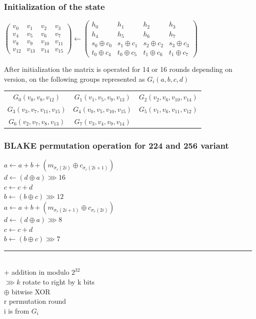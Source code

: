 \documentclass{beamer}
\begin{document}
\begin{frame}
\frametitle{Initialization of the state}
\begin{center}
$\begin{pmatrix} v_{0} & v_{1} & v_{2} & v_{3} \\ v_{4} & v_{5} & v_{6} & v_{7} \\
                 v_{8} & v_{9} & v_{10} & v_{11} \\ v_{12} & v_{13} & v_{14} & v_{15}\end{pmatrix} 
\gets
\begin{pmatrix} h_{0} & h_{1} & h_{2} & h_{3} \\ h_{4} & h_{5} & h_{6} & h_{7} \\
   s_{0} \oplus c_{0} & s_{1} \oplus c_{1} & s_{2} \oplus c_{2} & s_{3} \oplus c_{3} \\ 
   t_{0} \oplus c_{4} & t_{0} \oplus c_{5} & t_{1} \oplus c_{6} & t_{1} \oplus c_{7} \end{pmatrix}$
\end{center}
After initialization the matrix is operated for 14 or 16 rounds depending on version, on the following 
groups represented as $G_{i}(a, b, c, d)$
\begin{table}
  \begin{center}
    \begin{tabular}{ *{3}{c}}
    $ G_{0}(v_{0}, v_{8}, v_{12})$ & $G_{1}(v_{1}, v_{5}, v_{9}, v_{13})$ & $G_{2}(v_{2}, v_{6}, v_{10}, v_{14})$ \\
    $G_{3}(v_{3}, v_{7}, v_{11}, v_{15}) $ & $G_{4}(v_{0}, v_{5}, v_{10}, v_{15})$ & $G_{5}(v_{1}, v_{6}, v_{11}, v_{12})$ \\
    $G_{6}(v_{2}, v_{7}, v_{8}, v_{13})$ & $G_{7}(v_{3}, v_{4}, v_{9}, v_{14})$
    \end{tabular}
  \end{center}
\end{table}
\end{frame}

\begin{frame}
\frametitle{BLAKE permutation operation for 224 and 256 variant}
$a \gets a + b + (m_{\sigma_{r}(2i)} \oplus c_{\sigma_{r}(2i + 1)}) $ \\
$d \gets (d \oplus a) \ggg 16$ \\
$c \gets c + d$ \\
$b \gets (b \oplus c) \ggg 12$ \\
$a \gets a + b + (m_{\sigma_{r}(2i + 1)} \oplus c_{\sigma_{r}(2i)})$ \\
$d \gets (d \oplus a) \ggg 8$ \\
$c \gets c + d$ \\
$b \gets (b \oplus c) \ggg 7$ \\ 
\noindent\rule{10cm}{0.4pt} \\
\vspace{1mm}
+ addition in modulo $2^{32}$ \\
$\ggg k$ rotate to right by k bits \\
$\oplus$ bitwise XOR \\
r permutation round \\
i is from $G_{i}$
\end{frame}
\end{document}
